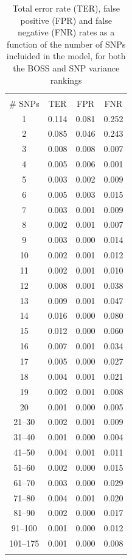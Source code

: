 \begin{table}
\centering
\caption{Total error rate (TER), false positive (FPR) and false negative
  (FNR) rates as a function of the number of SNPs incluided in the
  model, for both the BOSS and SNP variance rankings}
\label{tab:error}       %
\begin{tabular}{cccc}
\hline\noalign{\smallskip}
\multicolumn{4}{c}{BOSS}\\
\noalign{\smallskip}\hline\noalign{\smallskip}
\# SNPs & TER & FPR & FNR \\
\noalign{\smallskip}\hline\noalign{\smallskip}
1 & 0.114 & 0.081 & 0.252 \\
2 & 0.085 & 0.046 & 0.243 \\
3 & 0.008 & 0.008 &  0.007 \\
4 & 0.005 & 0.006 &  0.001 \\
5 & 0.003 & 0.002 &  0.009 \\
6 & 0.005 & 0.003&  0.015\\
7 & 0.003 & 0.001 &  0.009\\
8 & 0.002 & 0.001 &  0.007\\
9 & 0.003 & 0.000 &  0.014\\
10 & 0.002 & 0.001 &  0.012\\
11 & 0.002 & 0.001 &  0.010\\
12 & 0.008 & 0.001 &  0.038\\
13 & 0.009 & 0.001 &  0.047\\
14 & 0.016 & 0.000 &  0.080\\
15 & 0.012 & 0.000 &  0.060\\
16 & 0.007 & 0.001 &  0.034\\
17 & 0.005 & 0.000 &  0.027\\
18 & 0.004 & 0.001 &  0.021\\
19 & 0.002 & 0.001 &  0.008\\
20 & 0.001 & 0.000 &  0.005\\
21--30 & 0.002  & 0.001 & 0.009\\
31--40 & 0.001 & 0.000 & 0.004\\
41--50 & 0.004 & 0.001 & 0.011\\
51--60 & 0.002 & 0.000 & 0.015\\
61--70 & 0.003 & 0.000 & 0.029\\
71--80 & 0.004 & 0.001 & 0.020\\
81--90 & 0.002 & 0.000 & 0.017\\
91--100 & 0.001 & 0.000 & 0.012\\
101--175 & 0.001 &  0.000 & 0.008\\
\noalign{\smallskip}\hline
\end{tabular}
\end{table}

